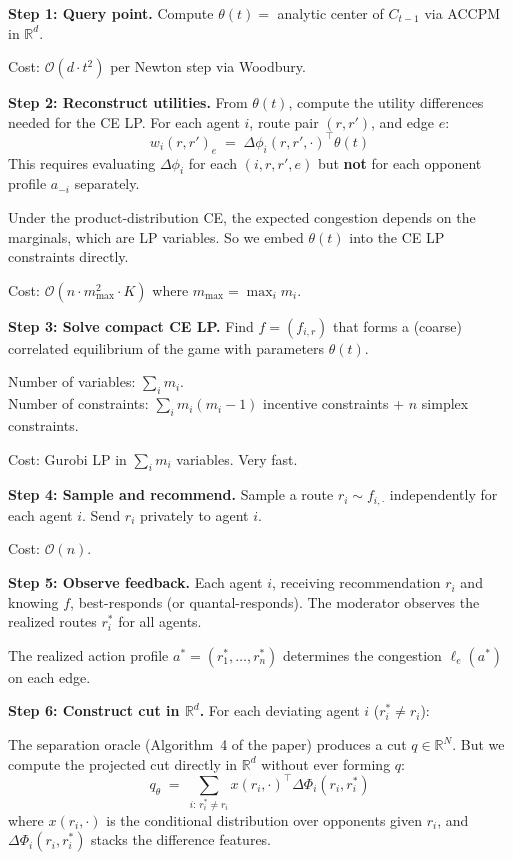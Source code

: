 \documentclass[11pt]{article}
\newcommand{\bigO}{\mathcal{O}}
\newcommand{\R}{\mathbb{R}}
\begin{document}
\textbf{Step 1: Query point.} Compute $\theta(t) = $ analytic center of $C_{t-1}$ via ACCPM in $\R^d$.

Cost: $\bigO(d \cdot t^2)$ per Newton step via Woodbury.

\medskip
\textbf{Step 2: Reconstruct utilities.} From $\theta(t)$, compute the utility differences needed for the CE LP. For each agent $i$, route pair $(r, r')$, and edge $e$:
\[
w_i(r, r')_e \;=\; \Delta\phi_i(r, r', \cdot)^\top \theta(t)
\]
This requires evaluating $\Delta\phi_i$ for each $(i, r, r', e)$ but \textbf{not} for each opponent profile $a_{-i}$ separately.

Under the product-distribution CE, the expected congestion depends on the marginals, which are LP variables. So we embed $\theta(t)$ into the CE LP constraints directly.

Cost: $\bigO(n \cdot m_{\max}^2 \cdot K)$ where $m_{\max} = \max_i m_i$.

\medskip
\textbf{Step 3: Solve compact CE LP.} Find $f = (f_{i,r})$ that forms a (coarse) correlated equilibrium of the game with parameters $\theta(t)$.

Number of variables: $\sum_i m_i$.\\
Number of constraints: $\sum_i m_i(m_i - 1)$ incentive constraints + $n$ simplex constraints.

Cost: Gurobi LP in $\sum_i m_i$ variables. Very fast.

\medskip
\textbf{Step 4: Sample and recommend.} Sample a route $r_i \sim f_{i,\cdot}$ independently for each agent $i$. Send $r_i$ privately to agent $i$.

Cost: $\bigO(n)$.

\medskip
\textbf{Step 5: Observe feedback.} Each agent $i$, receiving recommendation $r_i$ and knowing $f$, best-responds (or quantal-responds). The moderator observes the realized routes $r_i^*$ for all agents.

The realized action profile $a^* = (r_1^*, \ldots, r_n^*)$ determines the congestion $\ell_e(a^*)$ on each edge.

\medskip
\textbf{Step 6: Construct cut in $\R^d$.} For each deviating agent $i$ ($r_i^* \neq r_i$):

The separation oracle (Algorithm~4 of the paper) produces a cut $q \in \R^N$. But we compute the projected cut directly in $\R^d$ without ever forming $q$:
\[
q_\theta \;=\; \sum_{i:\, r_i^* \neq r_i} x(r_i, \cdot)^\top \Delta\Phi_i(r_i, r_i^*)
\]
where $x(r_i, \cdot)$ is the conditional distribution over opponents given $r_i$, and $\Delta\Phi_i(r_i, r_i^*)$ stacks the difference features.
\end{document}
